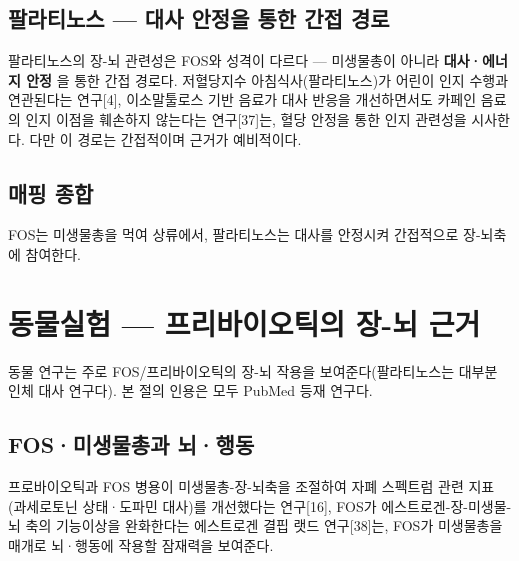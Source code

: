\documentclass[11pt,oneside]{book}
\begin{document}
\subsection{팔라티노스 — 대사 안정을 통한 간접 경로}
팔라티노스의 장-뇌 관련성은 FOS와 성격이 다르다 — 미생물총이 아니라 \textbf{대사·에너지 안정} 을 통한 간접 경로다. 저혈당지수 아침식사(팔라티노스)가 어린이 인지 수행과 연관된다는 연구[4], 이소말툴로스 기반 음료가 대사 반응을 개선하면서도 카페인 음료의 인지 이점을 훼손하지 않는다는 연구[37]는, 혈당 안정을 통한 인지 관련성을 시사한다. 다만 이 경로는 간접적이며 근거가 예비적이다.

\subsection{매핑 종합}
\vspace{2pt}\vspace{3pt}

FOS는 미생물총을 먹여 상류에서, 팔라티노스는 대사를 안정시켜 간접적으로 장-뇌축에 참여한다.

\section{동물실험 — 프리바이오틱의 장-뇌 근거}
동물 연구는 주로 FOS/프리바이오틱의 장-뇌 작용을 보여준다(팔라티노스는 대부분 인체 대사 연구다). 본 절의 인용은 모두 PubMed 등재 연구다.

\subsection{FOS·미생물총과 뇌·행동}
프로바이오틱과 FOS 병용이 미생물총-장-뇌축을 조절하여 자폐 스펙트럼 관련 지표(과세로토닌 상태·도파민 대사)를 개선했다는 연구[16], FOS가 에스트로겐-장-미생물-뇌 축의 기능이상을 완화한다는 에스트로겐 결핍 랫드 연구[38]는, FOS가 미생물총을 매개로 뇌·행동에 작용할 잠재력을 보여준다.
\end{document}
